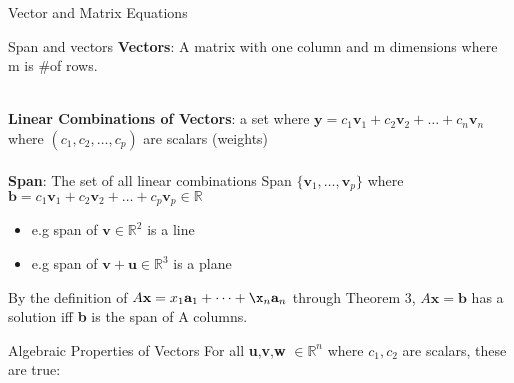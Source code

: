 \documentclass[a4paper, 12pt]{article}
\begin{document}
\begin{section}{Vector and Matrix Equations}
\begin{subsection}{Span and vectors}
	\textbf{Vectors}: A matrix with one column and m dimensions
	where m is #of rows.
\begin{itemize}
	\item{$\textbf{u}=\langle1,2\rangle$ 
	defines $\mathbb{R}^2$}
	\item{$\textbf{v}=\langle1,2,-5\rangle$ defines $\mathbb{R}^3$
\end{itemize}
\\ \textbf{Linear Combinations of Vectors}: a set where 
$\textbf{y}=c_1\textbf{v}_1+c_2\textbf{v}_2+\dots+c_n\textbf{v}_n$
where $(c_1,c_2,\dots,c_p)$ are scalars (weights)\\

\\ \noindent\textbf{Span}: The set of all linear combinations Span
    	$\lbrace \textbf{v}_1 , \dots , \textbf{v}_p \rbrace$ where 
	$\textbf{b}=c_1\textbf{v}_1+c_2\textbf{v}_2+\dots+
	c_p\textbf{v}_p \in \mathbb{R}$
\begin{itemize}
	\item{e.g span of $\textbf{v} \in \mathbb{R}^2$ is a line}
	\item{e.g span of $\textbf{v}+\textbf{u} 
	\in \mathbb{R}^3$ is a plane}
\end{itemize}
By the definition of 
$A\textbf{x}=x_1\textbf{a}_1+\dots+\x_n\textbf{a}_n$ through Theorem 3,
$A\textbf{x}=\textbf{b}$ has a solution iff \textbf{b} is the span of A
columns.
\end{subsection}
\begin{subsection}{Algebraic Properties of Vectors}
	For all \textbf{u},\textbf{v},\textbf{w} $\in \mathbb{R}^n$
	where $c_1 , c_2$ are scalars, these are true:
\begin{enumerate}
	\item{$\textbf{v}+\textbf{u}=\textbf{u}+\textbf{v}
	\Rightarrow (\textbf{u}+\textbf{v})+\textbf{w}=
	\textbf{u}+(\textbf{v}+\textbf{w})$
\item{$\textbf{u}+\textbf{0}=\textbf{u}$}
\item{$c(\textbf{u}+\textbf{v})=c\textbf{u}+c\textbf{v}$}
\item{$(c+d)\textbf{u}=c\textbf{u}+d\textbf{u}$}
\item{There is no $\textbf{u}*\textbf{v}$}
\end{enumerate}
\end{subsection}
\end{section}
\end{document}
